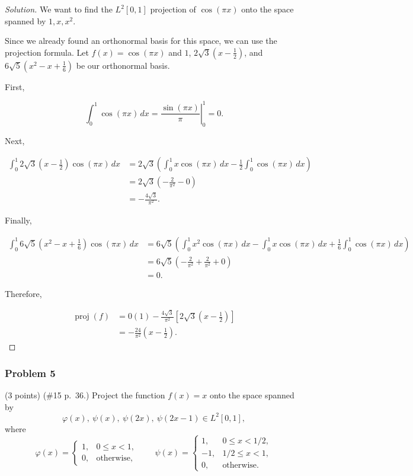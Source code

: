 \documentclass[11pt]{article}
\newcommand{\1}{\mathbf{1}}
\theoremstyle{definition}
\newenvironment{solution}{\begin{proof}[Solution]}{\end{proof}}
\begin{document}
\begin{solution}
We want to find the $L^2[0,1]$ projection of $\cos(\pi x)$ onto the space spanned by $1,x,x^2$.

\par Since we already found an orthonormal basis for this space, we can use the projection formula. Let $f(x)=\cos(\pi x)$ and $1$, $2\sqrt3\left(x-\frac12\right)$, and $6\sqrt5\left(x^2-x+\frac16\right)$ be our orthonormal basis.

\par First,

\[
\int_0^1\cos(\pi x)\,dx
=
\left.\frac{\sin(\pi x)}{\pi}\right|_0^1
=
0.
\]

\par Next,

\[
\begin{aligned}
\int_0^1
2\sqrt3\left(x-\frac12\right)\cos(\pi x)\,dx
&=
2\sqrt3\left(
\int_0^1x\cos(\pi x)\,dx
-\frac12\int_0^1\cos(\pi x)\,dx
\right)\\
&=
2\sqrt3\left(-\frac{2}{\pi^2}-0\right)\\
&=
-\frac{4\sqrt3}{\pi^2}.
\end{aligned}
\]

\par Finally,

\[
\begin{aligned}
\int_0^1
6\sqrt5\left(x^2-x+\frac16\right)\cos(\pi x)\,dx
&=
6\sqrt5\left(
\int_0^1x^2\cos(\pi x)\,dx
-\int_0^1x\cos(\pi x)\,dx
+\frac16\int_0^1\cos(\pi x)\,dx
\right)\\
&=
6\sqrt5\left(
-\frac{2}{\pi^2}
+\frac{2}{\pi^2}
+0
\right)\\
&=
0.
\end{aligned}
\]

\par Therefore,

\[
\begin{aligned}
\operatorname{proj}(f)
&=
0(1)
-\frac{4\sqrt3}{\pi^2}
\left[2\sqrt3\left(x-\frac12\right)\right]\\
&=
-\frac{24}{\pi^2}\left(x-\frac12\right).
\end{aligned}
\]
\end{solution}

\subsubsection*{Problem 5}
(3 points) (\#15 p.~36.) Project the function $f(x)=x$ onto the space spanned by
\[
\varphi(x),\ \psi(x),\ \psi(2x),\ \psi(2x-1)\in L^2[0,1],
\]
where
\[
\varphi(x)=
\begin{cases}
1, & 0\le x<1,\\
0, & \text{otherwise},
\end{cases}
\qquad
\psi(x)=
\begin{cases}
1, & 0\le x<1/2,\\
-1, & 1/2\le x<1,\\
0, & \text{otherwise}.
\end{cases}
\]
\end{document}
